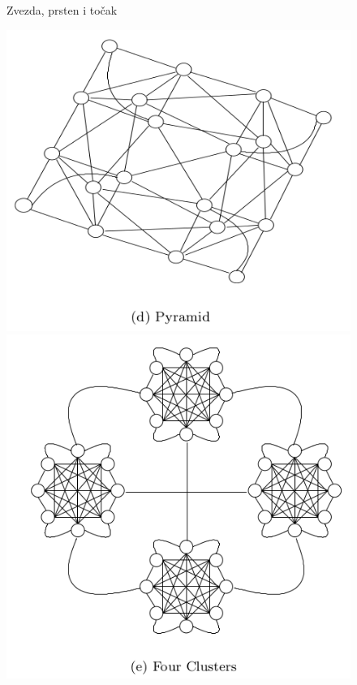 \documentclass[a4paper]{article}
\begin{document}
\begin{figure}[htp]
    \caption{Zvezda, prsten i točak}
    \label{fig:ZvezdaPrstenTocak}
\end{figure}
\begin{figure}[htp]
    \centering
    \includegraphics[scale=0.15]{Pyramid.png}
    \includegraphics[scale=0.15]{FourClusters.png}

\end{figure}
\end{document}
